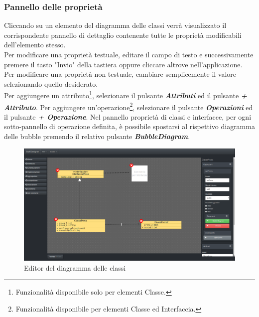 \documentclass[../ManualeUtente.tex]{subfiles}
\begin{document}
			\subsubsection{Pannello delle proprietà}
				Cliccando su un elemento del diagramma delle classi verrà visualizzato il corrispondente pannello
				di dettaglio contenente tutte le proprietà modificabili dell'elemento stesso.\\
				Per modificare una proprietà testuale, editare il campo di testo e successivamente premere il
				tasto "Invio" della tastiera oppure cliccare altrove nell'applicazione.\\
				Per modificare una proprietà non testuale, cambiare semplicemente il valore selezionando quello
				desiderato.\\
				Per aggiungere un attributo\footnote{Funzionalità disponibile solo per elementi Classe.},
				selezionare il pulsante \textit{\textbf{Attributi}} ed il pulsante \textit{\textbf{+ Attributo}}.
				Per aggiungere un'operazione\footnote{Funzionalità disponibile per elementi Classe ed Interfaccia.},
				selezionare il pulsante \textit{\textbf{Operazioni}} ed il pulsante \textit{\textbf{+ Operazione}}.
				Nel pannello proprietà di classi e interfacce, per ogni sotto-pannello di operazione definita,
				è possibile spostarsi al rispettivo diagramma delle bubble premendo il relativo pulsante
				\textit{\textbf{BubbleDiagram}}.
			\begin{figure} [h!]
				\centering
				\includegraphics[scale=0.24]{./Immagini/ClassDiagram.png}
				\caption{Editor del diagramma delle classi}\label{fig:ClassDiagram}
			\end{figure}
		\newpage
\end{document}
